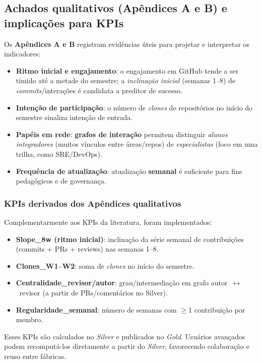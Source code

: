 \documentclass[
	12pt,
	openright,
	oneside,
	a4paper,
	brazil
]{abntex2}
\begin{document}
\subsection{Achados qualitativos (Apêndices A e B) e implicações para KPIs}
Os \textbf{Apêndices A e B} registram evidências úteis para projetar e interpretar os indicadores:
\begin{itemize}
    \item \textbf{Ritmo inicial e engajamento}: o engajamento em GitHub tende a ser tímido até a metade do semestre; a \emph{inclinação inicial} (semanas 1--8) de \emph{commits}/interações é candidata a preditor de sucesso.
    \item \textbf{Intenção de participação}: o número de \emph{clones} de repositórios no início do semestre sinaliza intenção de entrada.
    \item \textbf{Papéis em rede}: \textbf{grafos de interação} permitem distinguir \emph{alunos integradores} (muitos vínculos entre áreas/repos) de \emph{especialistas} (foco em uma trilha, como SRE/DevOps).
    \item \textbf{Frequência de atualização}: atualização \textbf{semanal} é suficiente para fins pedagógicos e de governança.
\end{itemize}

\subsubsection{KPIs derivados dos Apêndices qualitativos}
\label{sec:kpis-qualitativos}
Complementarmente aos KPIs da literatura, foram implementados:
\begin{itemize}
    \item \textbf{Slope\_8w (ritmo inicial)}: inclinação da série semanal de contribuições (commits + PRs + reviews) nas semanas 1--8.
    \item \textbf{Clones\_W1--W2}: soma de \emph{clones} no início do semestre.
    \item \textbf{Centralidade\_revisor/autor}: grau/intermediação em grafo autor~$\leftrightarrow$~revisor (a partir de PRs/comentários no Silver).
    \item \textbf{Regularidade\_semanal}: número de semanas com $\geq$1 contribuição por membro.
\end{itemize}
\noindent Esses KPIs são calculados no \emph{Silver} e publicados no \emph{Gold}. Usuários avançados podem recomputá-los diretamente a partir do \emph{Silver}, favorecendo colaboração e reuso entre fábricas.
\end{document}
